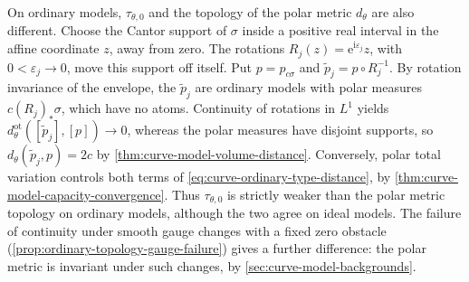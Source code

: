 On ordinary models, $\tau_{\theta,0}$ and the topology of the polar metric $d_\theta$ are also different. Choose the Cantor support of $\sigma$ inside a positive real interval in the affine coordinate $z$, away from zero. The rotations $R_j(z)=\mathrm e^{\mathrm i\varepsilon_j}z$, with $0<\varepsilon_j\to0$, move this support off itself. Put $p=p_{c\sigma}$ and $\widetilde p_j=p\circ R_j^{-1}$. By rotation invariance of the envelope, the $\widetilde p_j$ are ordinary models with polar measures $c(R_j)_*\sigma$, which have no atoms. Continuity of rotations in $L^1$ yields $d^{\mathrm{ot}}_\theta([\widetilde p_j],[p])\to0$, whereas the polar measures have disjoint supports, so $d_\theta(\widetilde p_j,p)=2c$ by \cref{thm:curve-model-volume-distance}. Conversely, polar total variation controls both terms of \eqref{eq:curve-ordinary-type-distance}, by \cref{thm:curve-model-capacity-convergence}. Thus $\tau_{\theta,0}$ is strictly weaker than the polar metric topology on ordinary models, although the two agree on ideal models. The failure of continuity under smooth gauge changes with a fixed zero obstacle (\cref{prop:ordinary-topology-gauge-failure}) gives a further difference: the polar metric is invariant under such changes, by \cref{sec:curve-model-backgrounds}.


